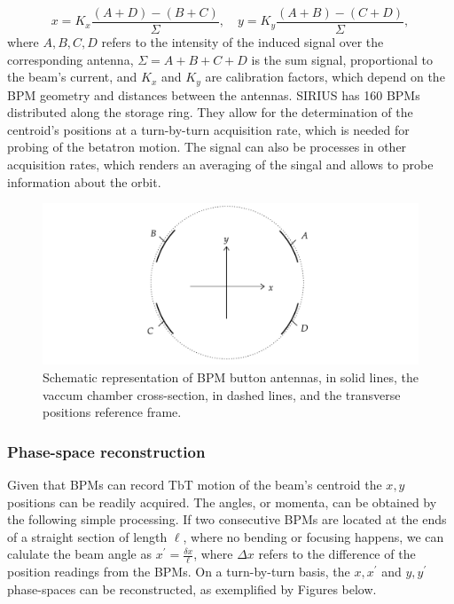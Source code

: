\begin{equation}
    x = K_x \frac{(A+D)-(B+C)}{\Sigma}, \quad y = K_y \frac{(A+B)-(C+D)}{\Sigma},
\end{equation}
where $A,B, C,D$ refers to the intensity of the induced signal over the corresponding antenna, $\Sigma=A+B+C+D$ is the sum signal, proportional to the beam's current, and $K_x$ and $K_y$ are calibration factors, which depend  on the BPM geometry  and distances between the antennas. SIRIUS has 160 BPMs distributed along the storage ring. They allow for the determination of the centroid's positions at a turn-by-turn acquisition rate, which is needed for probing of the betatron motion. The signal can also be processes in other acquisition rates, which renders an averaging of the singal and allows to probe information about the orbit.
\begin{figure}
    \centering
    \includegraphics[width=\textwidth]{Images/bpm_scheme.pdf}
    \caption{Schematic representation of BPM button antennas, in solid lines, the vaccum chamber cross-section, in dashed lines, and the transverse positions reference frame.}
    \label{fig:bpms_scheme}
\end{figure}
\subsubsection{Phase-space reconstruction}
Given that BPMs can record TbT motion of the beam's centroid the $x, y$ positions can be readily acquired. The angles, or momenta, can be obtained by the following simple processing. If two consecutive BPMs are located at the ends of a straight section of length $\ell$, where no bending or focusing happens, we can calulate the beam angle as $x^\prime = \frac{\delta x}{\ell}$, where $\Delta x$ refers to the difference of the position readings from the BPMs. On a turn-by-turn basis, the $x,x^\prime$ and $y, y^\prime$ phase-spaces can be reconstructed, as exemplified by Figures below.
